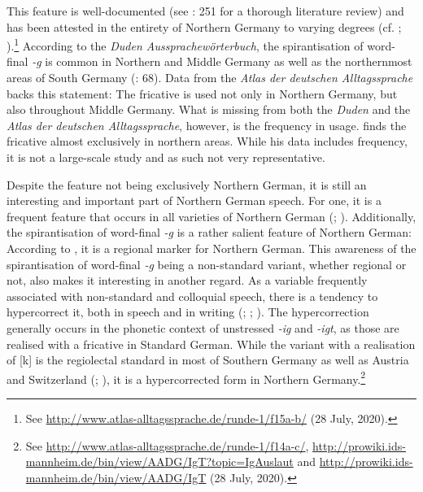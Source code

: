 \documentclass[output=paper]{langsci/langscibook}
\begin{document}
 

This feature is well-documented (see \citealt{elmentaler_norddeutscher_2015}: 251 for a thorough literature review) and has been attested in the entirety of Northern Germany to varying degrees (cf. \citealt[305]{konig_atlas_2019b}; \citealt{elspas_atlas_2003}).\footnote{See \url{http://www.atlas-alltagssprache.de/runde-1/f15a-b/} (28 July, 2020).} According to the \textit{Duden Aussprachewörterbuch}, the spirantisation of word-final \textit{\nobreakdash-g} is common in Northern and Middle Germany as well as the northernmost areas of South Germany (\citealt{kleiner_duden_2015}: 68). Data from the \textit{Atlas der deutschen Alltagssprache} backs this statement: The fricative is used not only in Northern Germany, but also throughout Middle Germany. What is missing from both the \textit{Duden} and the \textit{Atlas der deutschen Alltagssprache}, however, is the frequency in usage. \citet[302--306]{konig_atlas_2019b} finds the fricative almost exclusively in northern areas. While his data includes frequency, it is not a large-scale study and as such not very representative. 

Despite the feature not being exclusively Northern German, it is still an interesting and important part of Northern German speech. For one, it is a frequent feature that occurs in all varieties of Northern German (\citealt[197]{lauf_regional_1996}; \citealt[2113]{mihm_sprachgeschichte_2000}). Additionally, the spirantisation of word-final \textit{-g} is a rather salient feature of Northern German: According to \citet[159]{berend_standard_2008}, it is a regional marker for Northern German. This awareness of the spirantisation of word-final \textit{-g} being a non-standard variant, whether regional or not, also makes it interesting in another regard. As a variable frequently associated with non-standard and colloquial speech, there is a tendency to hypercorrect it, both in speech and in writing (\citealt{rosenberg_berliner_1986}; \citealt{martens_niederdeutsch-bedingte_1988}; \citealt{eichinger_deutsche_2007}). The hypercorrection generally occurs in the phonetic context of unstressed \textit{-ig} and \textit{-igt}, as those are realised with a fricative in Standard German. While the variant with a realisation of [k] is the regiolectal standard in most of Southern Germany as well as Austria and Switzerland (\citealt{elspas_atlas_2003}; \citealt{kleiner_atlas_2011}), it is a hypercorrected form in Northern Germany.\footnote{See \url{http://www.atlas-alltagssprache.de/runde-1/f14a-c/}, \url{http://prowiki.ids-mannheim.de/bin/view/AADG/IgT?topic=IgAuslaut} and \url{http://prowiki.ids-mannheim.de/bin/view/AADG/IgT} (28 July, 2020).}
\end{document}
